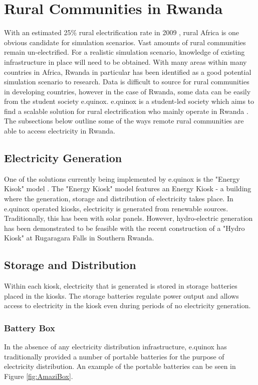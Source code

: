 \clearpage

\section*{Rural Communities in Rwanda}
With an estimated 25\% rural electrification rate in 2009 \cite{IEA-web:2015}, rural Africa is one obvious candidate for simulation scenarios. Vast amounts of rural communities remain un-electrified. For a realistic simulation scenario, knowledge of existing infrastructure in place will need to be obtained. With many areas within many countries in Africa, Rwanda in particular has been identified as a good potential simulation scenario to research. Data is difficult to source for rural communities in developing countries, however in the case of Rwanda, some data can be easily from the student society e.quinox. e.quinox is a student-led society which aims to find a scalable solution for rural electrification who mainly operate in Rwanda \cite{e.quinox-web:2015}. The subsections below outline some of the ways remote rural communities are able to access electricity in Rwanda.

\subsection*{Electricity Generation}
One of the solutions currently being implemented by e.quinox is the "Energy Kisok" model \cite{e.quinox-EK-web:2015}. The "Energy Kiosk" model features an Energy Kiosk - a building where the generation, storage and distribution of electricity takes place.
In e.quinox operated kiosks, electricity is generated from renewable sources.
Traditionally, this has been with solar panels. However, hydro-electric generation has been demonstrated to be feasible with the recent construction of a "Hydro Kiosk" at Rugaragara Falls in Southern Rwanda.

\subsection*{Storage and Distribution}
Within each kiosk, electricity that is generated is stored in storage batteries placed in the kiosks. The storage batteries regulate power output and allows access to electricity in the kiosk even during periods of no electricity generation.

\subsubsection*{Battery Box}
In the absence of any electricity distribution infrastructure, e.quinox has traditionally provided a number of portable batteries for the purpose of electricity distribution. An example of the portable batteries can be seen in Figure \ref{fig:AmaziBox}.


